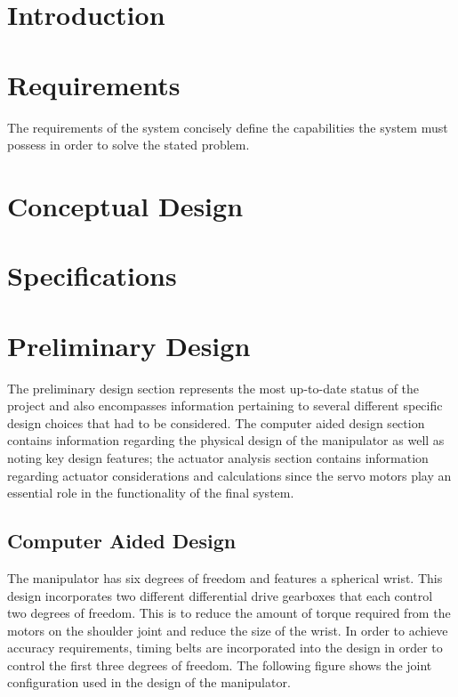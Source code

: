 \section{Introduction}

\section{Requirements}
The requirements of the system concisely define the capabilities the system must possess in order to solve the stated problem.

\newpage
\section{Conceptual Design}

\newpage
\section{Specifications}

\newpage
\section{Preliminary Design}
The preliminary design section represents the most up-to-date status of the project and also encompasses information pertaining to several different specific design choices that had to be considered. The computer aided design section contains information regarding the physical design of the manipulator as well as noting key design features; the actuator analysis section contains information regarding actuator considerations and calculations since the servo motors play an essential role in the functionality of the final system.
\subsection{Computer Aided Design}
The manipulator has six degrees of freedom and features a spherical wrist. This design incorporates two different differential drive gearboxes that each control two degrees of freedom. This is to reduce the amount of torque required from the motors on the shoulder joint and reduce the size of the wrist. In order to achieve accuracy requirements, timing belts are incorporated into the design in order to control the first three degrees of freedom. The following figure shows the joint configuration used in the design of the manipulator.

